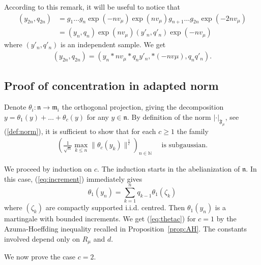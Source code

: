 \documentclass[11pt,leqno]{article}
\theoremstyle{plain}
\theoremstyle{definition}
\theoremstyle{remark}
\numberwithin{equation}{section}
\begin{document}
According to this remark, it will be useful to notice that
\begin{align*}
(y_{2n},q_{2n}) & =g_1\dots g_n \exp(-nv_\mu)\exp(nv_\mu)g_{n+1}\dots g_{2n}\exp(-2nv_\mu) \\
&= (y_n,q_n)\exp(nv_\mu)(y'_n,q'_n)\exp(-nv_\mu)
\end{align*}
where $(y'_n,q'_n)$ is an independent sample. We get
\begin{align}\label{eq:y2n}
(y_{2n},q_{2n})=(y_n \ast nv_\mu\ast q_ny'_n,\ast(-nv\mu), q_nq'_n).
\end{align}

\subsection{Proof of concentration in adapted norm}

Denote $\theta_i:\mathfrak{n}\to \mathfrak{m}_i$ the orthogonal projection, giving the decomposition $y=\theta_1(y)+\dots+\theta_c(y)$ for any $y \in \mathfrak{n}$.
By definition of the norm $|\cdot|_{\mathfrak{F}_\mu}$, see (\ref{def:norm}), it is sufficient to show that for each $c\ge 1$ the family
\begin{align}\label{eq:thetac}
\left( \frac{1}{\sqrt{n}}\max_{k\le n}\|\theta_c(y_k)\|^{\frac{1}{c}} \right)_{n\in \mathbb{N}} \quad  \textrm{ is subgaussian.}
\end{align}

We proceed by induction on $c$.
The induction starts in the abelianization of $\mathfrak{n}$. In this case, (\ref{eq:increment}) immediately gives
\[
\theta_1(y_n)=\sum_{k=1}^n q_{k-1}\theta_1(\zeta_k)
\]
where $(\zeta_k)$ are compactly supported i.i.d. centred. Then $\theta_1(y_n)$ is a martingale with bounded increments. We get (\ref{eq:thetac}) for $c=1$ by the Azuma-Hoeffding inequality recalled in Proposition~\ref{prop:AH}. The constants involved depend only on $R_\mu$ and $d$.




We now prove the case $c=2$.
 
\end{document}
